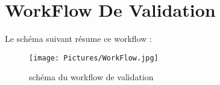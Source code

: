 \documentclass[11pt,fleqn]{book} %
\begin{document}
\section{WorkFlow De Validation}
Le schéma suivant résume ce workflow :
\begin{figure}[h]
    \centering
    \texttt{[image: Pictures/WorkFlow.jpg]}
    \caption{schéma du workflow de validation}
    \label{fig:pca}
\end{figure}
\end{document}
